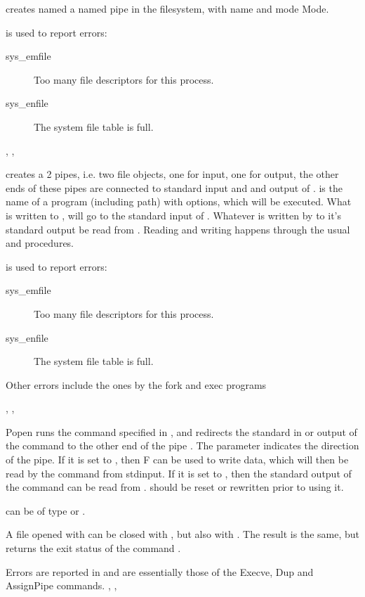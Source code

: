 

{ creates named a named pipe in the filesystem, with name
 and mode {Mode}. 
}
{  is used to report errors:
\begin{description}
\item[sys\_emfile] Too many file descriptors for this process.
\item[sys\_enfile] The system file table is full.
\end{description}
}
{, , }


{ creates a 2 pipes, i.e. two file objects, one for input, one for
output, the other ends of these pipes are connected to standard input and and
output of .  is the name of a program (including path)
with options, which will be executed.
What is written to , will go to the standard input of
. Whatever is written by  to it's standard output be read from
.
Reading and writing happens through the usual  and
 procedures.
}
{  is used to report errors:
\begin{description}
\item[sys\_emfile] Too many file descriptors for this process.
\item[sys\_enfile] The system file table is full.
\end{description}
Other errors include the ones by the fork and exec programs
}
{, ,}



{ Popen runs the command specified in ,
 and redirects the standard in or output of the
command to the other end of the pipe . The parameter 
indicates the direction of the pipe. If it is set to , then F can
be used to write data, which will then be read by the command from stdinput.
If it is set to , then the standard output of the command can be 
read from .  should be reset or rewritten prior to using it.

 can be of type  or .

A file opened with  can be closed with , but also
with . The result is the same, but  returns the
exit status of the command .}
{Errors are reported in  and are essentially those of the
Execve, Dup and AssignPipe commands.
}
{, , }

